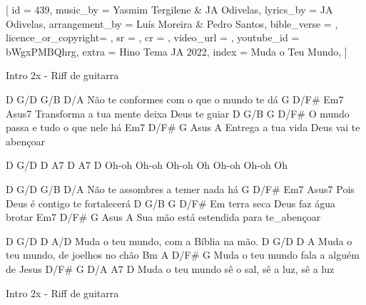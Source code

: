 [
    id                  = {439},
    music_by            = {Yasmim Tergilene & JA Odivelas}, %
    lyrics_by           = {JA Odivelas}, %
    arrangement_by      = {Luís Moreira & Pedro Santos}, %
    bible_verse         = {},
    licence_or_copyright= {},
    sr                  = {},
    cr                  = {},
    video_url           = {}, %
    youtube_id          = {bWgxPMBQhrg}, %
    extra               = {Hino Tema JA 2022},
    index               = {Muda o Teu Mundo},
]

\beginverse
Intro 2x - Riff de guitarra
\endverse

\beginverse
D         G/D                G/B      D/A	
Não te conformes com o que o mundo te dá
     G           D/F#        Em7        Asus7
Transforma a tua mente deixa Deus te guiar
D       G/B            G        D/F#
O mundo passa e tudo o que nele há
  Em7         D/F#          G        Asus A
Entrega a tua vida Deus vai te abençoar

D     G/D   D     A7   D     A7    D
Oh-oh Oh-oh Oh-oh Oh   Oh-oh Oh-oh Oh

\endverse

\beginverse
D       G/D          G/B      D/A
Não te assombres a temer nada há
     G         D/F#       Em7   Asus7
Pois Deus é contigo te fortalecerá
D        G/B           G       D/F#
Em terra seca Deus faz água brotar
    Em7           D/F#         G     Asus A
Sua mão está estendida para te_abençoar

\endverse

\beginchorus
D          G/D          D         A/D
Muda o teu mundo, com a Bíblia na mão.
D          G/D         D        A
Muda o teu mundo, de joelhos no chão
Bm         A             D/F#       G
Muda o teu mundo fala a alguém de Jesus
D/F#       G          D/A       A7        D
Muda o teu mundo sê o sal, sê a luz, sê a luz

\endchorus

\beginverse
Intro 2x - Riff de guitarra
\endverse

